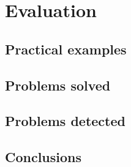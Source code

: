 \chapter{Evaluation}\label{chap:chap4}

\section*{}

\section{Practical examples}

\section{Problems solved}

\section{Problems detected}

\section{Conclusions}
